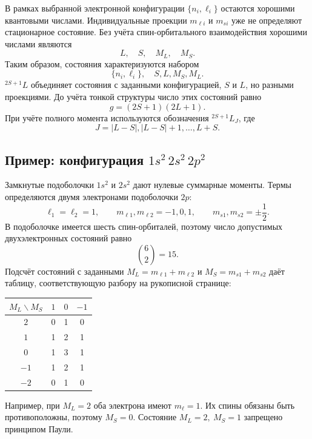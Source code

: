 \documentclass[../final.tex]{subfiles}
\begin{document}
В рамках выбранной электронной конфигурации \(\{n_i,\ell_i\}\)
остаются хорошими квантовыми числами. Индивидуальные проекции
\(m_{\ell i}\) и \(m_{s i}\) уже не определяют стационарное состояние.
Без учёта спин-орбитального взаимодействия хорошими числами являются
\begin{equation*}
    L,\quad S,\quad M_L,\quad M_S.
\end{equation*}
Таким образом, состояния характеризуются набором
\begin{equation*}
    \{n_i,\ell_i\},\quad S,L,M_S,M_L.
\end{equation*}
 \({}^{2S+1}L\) объединяет состояния
с заданными конфигурацией, \(S\) и \(L\), но разными проекциями.
До учёта тонкой структуры число этих состояний равно
\begin{equation*}
    g=(2S+1)(2L+1).
\end{equation*}
При учёте полного момента используются обозначения
\({}^{2S+1}L_J\), где
\begin{equation*}
    J=|L-S|,|L-S|+1,\ldots,L+S.
\end{equation*}

\subsection{Пример: конфигурация \(1s^2\,2s^2\,2p^2\)}

Замкнутые подоболочки \(1s^2\) и \(2s^2\) дают нулевые суммарные
моменты. Термы определяются двумя электронами подоболочки \(2p\):
\begin{equation*}
    \ell_1=\ell_2=1,\qquad
    m_{\ell 1},m_{\ell 2}=-1,0,1,
    \qquad m_{s1},m_{s2}=\pm\frac12.
\end{equation*}
В подоболочке имеется шесть спин-орбиталей, поэтому число допустимых
двухэлектронных состояний равно
\begin{equation*}
    \binom62=15.
\end{equation*}
Подсчёт состояний с заданными
\(M_L=m_{\ell1}+m_{\ell2}\) и \(M_S=m_{s1}+m_{s2}\)
даёт таблицу, соответствующую разбору на рукописной странице:
\begin{center}
\renewcommand{\arraystretch}{1.3}
\begin{tabular}{c|ccc}
    \hline
    \(M_L\backslash M_S\)&\(1\)&\(0\)&\(-1\)\\
    \hline
    \(2\)&0&1&0\\
    \(1\)&1&2&1\\
    \(0\)&1&3&1\\
    \(-1\)&1&2&1\\
    \(-2\)&0&1&0\\
    \hline
\end{tabular}
\end{center}
Например, при \(M_L=2\) оба электрона имеют \(m_\ell=1\).
Их спины обязаны быть противоположны, поэтому \(M_S=0\).
Состояние \(M_L=2,\ M_S=1\) запрещено принципом Паули.
\end{document}
